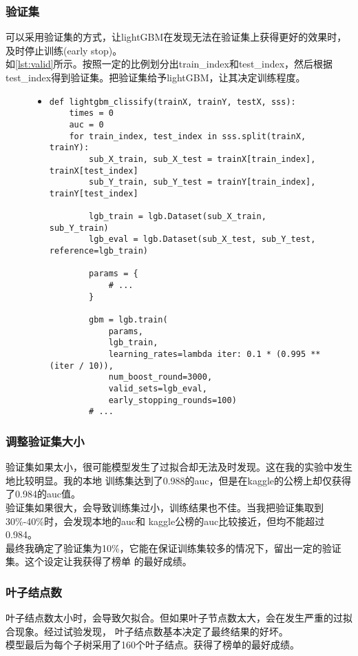 \documentclass[a4paper]{article}
\begin{document}
\subsubsection{验证集}
可以采用验证集的方式，让lightGBM在发现无法在验证集上获得更好的效果时，及时停止训练(early stop)。\\

如\autoref{lst:valid}所示。按照一定的比例划分出train\_index和test\_index，然后根据
test\_index得到验证集。把验证集给予lightGBM，让其决定训练程度。

\begin{figure}[!hbt]
\begin{itemize}
\item[] \begin{lstlisting}[style=mypython, label=lst:valid, caption=验证集防止过拟合]
def lightgbm_clissify(trainX, trainY, testX, sss):
    times = 0
    auc = 0
    for train_index, test_index in sss.split(trainX, trainY):
        sub_X_train, sub_X_test = trainX[train_index], trainX[test_index]
        sub_Y_train, sub_Y_test = trainY[train_index], trainY[test_index]

        lgb_train = lgb.Dataset(sub_X_train, sub_Y_train)
        lgb_eval = lgb.Dataset(sub_X_test, sub_Y_test, reference=lgb_train)

        params = {
            # ...
        }

        gbm = lgb.train(
            params, 
            lgb_train, 
            learning_rates=lambda iter: 0.1 * (0.995 ** (iter / 10)),
            num_boost_round=3000, 
            valid_sets=lgb_eval, 
            early_stopping_rounds=100)
        # ...
\end{lstlisting}
\end{itemize}
\end{figure}
\subsubsection{调整验证集大小}
验证集如果太小，很可能模型发生了过拟合却无法及时发现。这在我的实验中发生地比较明显。我的本地
训练集达到了0.988的auc，但是在kaggle的公榜上却仅获得了0.984的auc值。\\

验证集如果很大，会导致训练集过小，训练结果也不佳。当我把验证集取到30\%-40\%时，会发现本地的auc和
kaggle公榜的auc比较接近，但均不能超过0.984。\\

最终我确定了验证集为10\%，它能在保证训练集较多的情况下，留出一定的验证集。这个设定让我获得了榜单
的最好成绩。
\subsubsection{叶子结点数}
叶子结点数太小时，会导致欠拟合。但如果叶子节点数太大，会在发生严重的过拟合现象。经过试验发现，
叶子结点数基本决定了最终结果的好坏。\\

模型最后为每个子树采用了160个叶子结点。获得了榜单的最好成绩。

\end{document}
